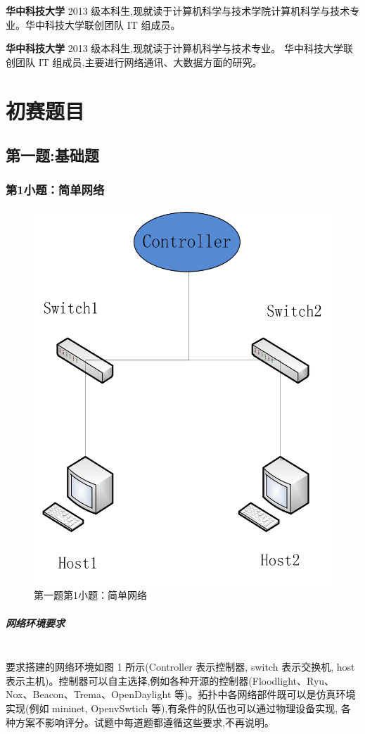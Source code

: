 \documentclass[format=draft,language=chinese,category=SDN]{hustreport}
\newcommand{\myparagraph}[1]{\paragraph{#1}\mbox{}\\}
\begin{document}
\textbf{华中科技大学} 2013 级本科生,现就读于计算机科学与技术学院计算机科学与技术专业。华中科技大学联创团队 IT 组成员。


\textbf{华中科技大学} 2013 级本科生,现就读于计算机科学与技术专业。
华中科技大学联创团队 IT 组成员,主要进行网络通讯、大数据方面的研究。

\chapter{初赛题目}\label{chapter:Questions}


\section{第一题:基础题}\label{sec:Q1}
\subsection{第1小题：简单网络}\label{sec:Q1_1}

\begin{figure}[!h] \centering
\includegraphics[width=.618\textwidth]{fig/1_1-0.png}
\caption{第一题第1小题：简单网络}\label{fig:Q1_1-0}
\end{figure}

\myparagraph{网络环境要求}
要求搭建的网络环境如图 1 所示(Controller 表示控制器, switch 表示交换机, host表示主机)。控制器可以自主选择,例如各种开源的控制器(Floodlight、Ryu、
Nox、Beacon、Trema、OpenDaylight 等)。拓扑中各网络部件既可以是仿真环境实现(例如 mininet, OpenvSwtich 等),有条件的队伍也可以通过物理设备实现,
各种方案不影响评分。试题中每道题都遵循这些要求,不再说明。
\end{document}
